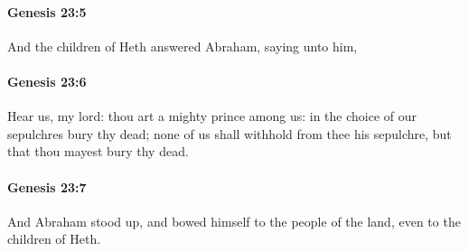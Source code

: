 		\paragraph{Genesis 23:5} %
			\label{GENESIS-23-5}

			And the children of Heth answered Abraham, saying unto him,


		\paragraph{Genesis 23:6} %
			\label{GENESIS-23-6}

			Hear us, my lord: thou art a mighty prince among us: in the choice of our sepulchres bury thy dead; none of us shall withhold from thee his sepulchre, but that thou mayest bury thy dead.


		\paragraph{Genesis 23:7} %
			\label{GENESIS-23-7}

			And Abraham stood up, and bowed himself to the people of the land, even to the children of Heth.


